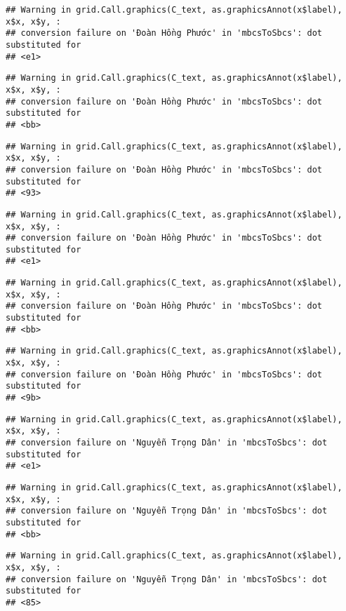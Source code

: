 \documentclass[
]{article}
\begin{document}
\begin{verbatim}
## Warning in grid.Call.graphics(C_text, as.graphicsAnnot(x$label), x$x, x$y, :
## conversion failure on 'Đoàn Hồng Phước' in 'mbcsToSbcs': dot substituted for
## <e1>
\end{verbatim}

\begin{verbatim}
## Warning in grid.Call.graphics(C_text, as.graphicsAnnot(x$label), x$x, x$y, :
## conversion failure on 'Đoàn Hồng Phước' in 'mbcsToSbcs': dot substituted for
## <bb>
\end{verbatim}

\begin{verbatim}
## Warning in grid.Call.graphics(C_text, as.graphicsAnnot(x$label), x$x, x$y, :
## conversion failure on 'Đoàn Hồng Phước' in 'mbcsToSbcs': dot substituted for
## <93>
\end{verbatim}

\begin{verbatim}
## Warning in grid.Call.graphics(C_text, as.graphicsAnnot(x$label), x$x, x$y, :
## conversion failure on 'Đoàn Hồng Phước' in 'mbcsToSbcs': dot substituted for
## <e1>
\end{verbatim}

\begin{verbatim}
## Warning in grid.Call.graphics(C_text, as.graphicsAnnot(x$label), x$x, x$y, :
## conversion failure on 'Đoàn Hồng Phước' in 'mbcsToSbcs': dot substituted for
## <bb>
\end{verbatim}

\begin{verbatim}
## Warning in grid.Call.graphics(C_text, as.graphicsAnnot(x$label), x$x, x$y, :
## conversion failure on 'Đoàn Hồng Phước' in 'mbcsToSbcs': dot substituted for
## <9b>
\end{verbatim}

\begin{verbatim}
## Warning in grid.Call.graphics(C_text, as.graphicsAnnot(x$label), x$x, x$y, :
## conversion failure on 'Nguyễn Trọng Dân' in 'mbcsToSbcs': dot substituted for
## <e1>
\end{verbatim}

\begin{verbatim}
## Warning in grid.Call.graphics(C_text, as.graphicsAnnot(x$label), x$x, x$y, :
## conversion failure on 'Nguyễn Trọng Dân' in 'mbcsToSbcs': dot substituted for
## <bb>
\end{verbatim}

\begin{verbatim}
## Warning in grid.Call.graphics(C_text, as.graphicsAnnot(x$label), x$x, x$y, :
## conversion failure on 'Nguyễn Trọng Dân' in 'mbcsToSbcs': dot substituted for
## <85>
\end{verbatim}
\end{document}
